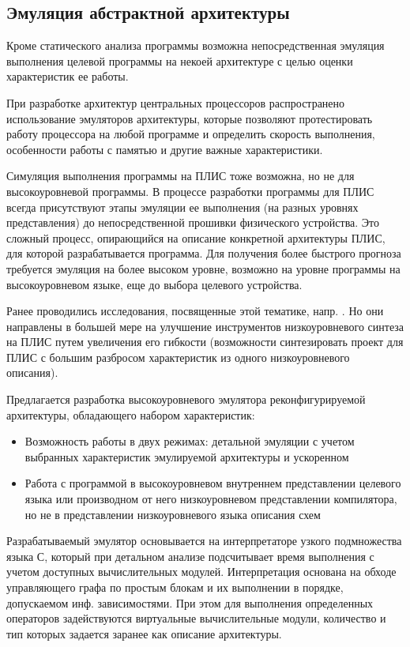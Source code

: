 \documentclass[utf8]{psta}%
\begin{document}
\subsection{Эмуляция абстрактной архитектуры}

Кроме статического анализа программы возможна непосредственная эмуляция выполнения целевой программы на некоей архитектуре с целью оценки характеристик ее работы.

При разработке архитектур центральных процессоров распространено использование эмуляторов архитектуры, которые позволяют протестировать работу процессора на любой программе и определить скорость выполнения, особенности работы с памятью и другие важные характеристики. 

Симуляция выполнения программы на ПЛИС тоже возможна, но не для высокоуровневой программы. В процессе разработки программы для ПЛИС всегда присутствуют этапы эмуляции ее выполнения (на разных уровнях представления) до непосредственной прошивки физического устройства. Это сложный процесс, опирающийся на описание конкретной архитектуры ПЛИС, для которой разрабатывается программа. Для получения более быстрого прогноза требуется эмуляция на более высоком уровне, возможно на уровне программы на высокоуровневом языке, еще до выбора целевого устройства.

Ранее проводились исследования, посвященные этой тематике, напр. \cite{Takamaeda-Yamazaki2014}. Но они направлены в большей мере на улучшение инструментов низкоуровневого синтеза на ПЛИС путем увеличения его гибкости (возможности синтезировать проект для ПЛИС с большим разбросом характеристик из одного низкоуровневого описания).

Предлагается разработка высокоуровневого эмулятора реконфигурируемой архитектуры, обладающего набором характеристик:

\begin{itemize}
    \item Возможность работы в двух режимах: детальной эмуляции с учетом выбранных характеристик эмулируемой архитектуры и ускоренном
    \item Работа с программой в высокоуровневом внутреннем представлении целевого языка или производном от него низкоуровневом представлении компилятора, но не в представлении низкоуровневого языка описания схем
    
\end{itemize}

Разрабатываемый эмулятор основывается на интерпретаторе узкого подмножества языка С, который при детальном анализе подсчитывает время выполнения с учетом доступных вычислительных модулей. Интерпретация основана на обходе управляющего графа по простым блокам и их выполнении в порядке, допускаемом инф. зависимостями. При этом для выполнения определенных операторов задействуются виртуальные вычислительные модули, количество и тип которых задается заранее как описание архитектуры.
\end{document}
